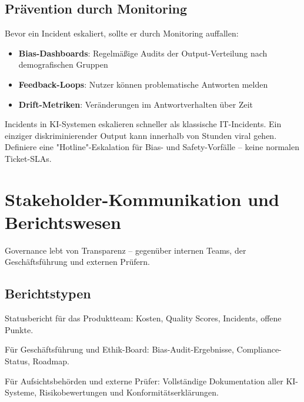\subsection{Prävention durch Monitoring}

Bevor ein Incident eskaliert, sollte er durch Monitoring auffallen:

\begin{itemize}[leftmargin=*]
    \item \textbf{Bias-Dashboards}: Regelmäßige Audits der Output-Verteilung nach demografischen Gruppen
    \item \textbf{Feedback-Loops}: Nutzer können problematische Antworten melden
    \item \textbf{Drift-Metriken}: Veränderungen im Antwortverhalten über Zeit
\end{itemize}

\begin{praxishinweis}
Incidents in KI-Systemen eskalieren schneller als klassische IT-Incidents. Ein einziger diskriminierender Output kann innerhalb von Stunden viral gehen. Definiere eine "Hotline"-Eskalation für Bias- und Safety-Vorfälle -- keine normalen Ticket-SLAs.
\end{praxishinweis}

\section{Stakeholder-Kommunikation und Berichtswesen}

Governance lebt von Transparenz -- gegenüber internen Teams, der Geschäftsführung und externen Prüfern.

\subsection{Berichtstypen}

\begin{description}[leftmargin=*,style=nextline]
    \item[Monatliches KI-Update] Statusbericht für das Produktteam: Kosten, Quality Scores, Incidents, offene Punkte.
    \item[Quartalsweiser Governance-Report] Für Geschäftsführung und Ethik-Board: Bias-Audit-Ergebnisse, Compliance-Status, Roadmap.
    \item[Jährlicher Compliance-Bericht] Für Aufsichtsbehörden und externe Prüfer: Vollständige Dokumentation aller KI-Systeme, Risikobewertungen und Konformitätserklärungen.
\end{description}

